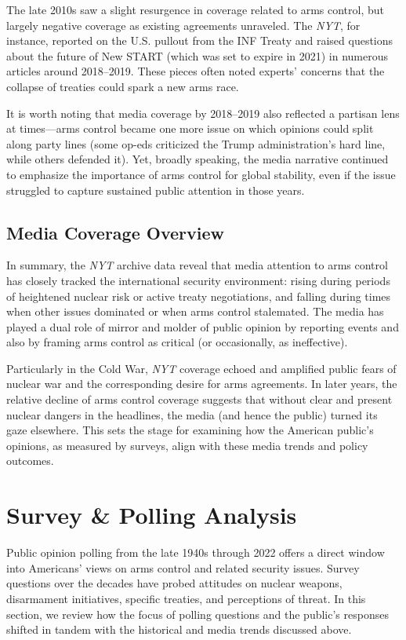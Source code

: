 \documentclass[11,5 pt]{article}
\begin{document}
    The late 2010s saw a slight resurgence in coverage related to arms control, but largely negative coverage as existing agreements unraveled. The \textit{NYT}, for instance, reported on the U.S. pullout from the INF Treaty and raised questions about the future of New START (which was set to expire in 2021) in numerous articles around 2018–2019. These pieces often noted experts’ concerns that the collapse of treaties could spark a new arms race. 
    
    It is worth noting that media coverage by 2018–2019 also reflected a partisan lens at times—arms control became one more issue on which opinions could split along party lines (some op-eds criticized the Trump administration’s hard line, while others defended it). Yet, broadly speaking, the media narrative continued to emphasize the importance of arms control for global stability, even if the issue struggled to capture sustained public attention in those years. 
    

\subsection*{Media Coverage Overview}

    In summary, the \textit{NYT} archive data reveal that media attention to arms control has closely tracked the international security environment: rising during periods of heightened nuclear risk or active treaty negotiations, and falling during times when other issues dominated or when arms control stalemated. The media has played a dual role of mirror and molder of public opinion by reporting events and also by framing arms control as critical (or occasionally, as ineffective). 
    
    Particularly in the Cold War, \textit{NYT} coverage echoed and amplified public fears of nuclear war and the corresponding desire for arms agreements. In later years, the relative decline of arms control coverage suggests that without clear and present nuclear dangers in the headlines, the media (and hence the public) turned its gaze elsewhere. This sets the stage for examining how the American public’s opinions, as measured by surveys, align with these media trends and policy outcomes.
    

\section{Survey \& Polling Analysis}
    \label{section:Survey Data}

    Public opinion polling from the late 1940s through 2022 offers a direct window into Americans’ views on arms control and related security issues. Survey questions over the decades have probed attitudes on nuclear weapons, disarmament initiatives, specific treaties, and perceptions of threat. In this section, we review how the focus of polling questions and the public’s responses shifted in tandem with the historical and media trends discussed above. 
    
\end{document}
